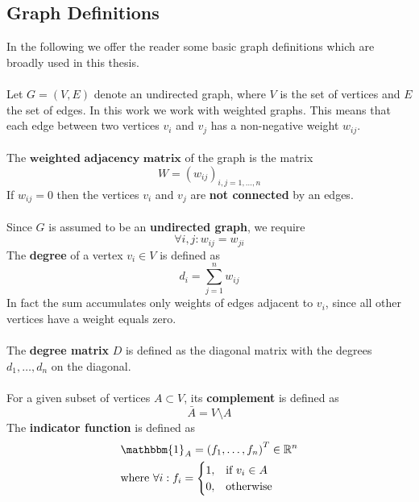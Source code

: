 \subsection{Graph Definitions}
In the following we offer the reader some basic graph definitions which are broadly used in this thesis. \\ \\ 
Let $G = (V, E)$ denote an undirected graph, where $V$ is the set of vertices and $E$ the set of edges. In this work we work with weighted graphs. This means that each edge between two vertices $v_i$ and $v_j$ has a non-negative weight $w_{ij}$. \\ \\
The $\textbf{weighted adjacency matrix}$ of the graph is the matrix 
\begin{equation}
W = \left( w_{ij} \right)_{i,j=1,\dots, n}
\label{eq:def_adjacency_matrix}
\end{equation}
If $w_{ij} = 0$ then the vertices $v_i$ and $v_j$ are \textbf{not connected} by an edges. \\ \\
Since $G$ is assumed to be an \textbf{undirected graph}, we require
\begin{equation}
	\forall i,j : w_{ij} = w_{ji}
\end{equation}
The \textbf{degree} of a vertex $v_i \in V$ is defined as
\begin{equation}
	d_i = \sum_{j=1}^n w_{ij}
\label{eq:vertex_degree}
\end{equation}
In fact the sum accumulates only weights of edges adjacent to $v_i$, since all other vertices have a weight equals zero. \\ \\
The \textbf{degree matrix} $D$ is defined as the diagonal matrix with the degrees $d_1,\dots, d_n$ on the diagonal. \\ \\
For a given subset of vertices $A \subset V$, its \textbf{complement} is defined as
\begin{equation}
	\bar{A} = V \setminus A
\label{eq:set_complement}
\end{equation}
The \textbf{indicator function} is defined as
\begin{equation}
\begin{aligned}
& \mathbbm{1}_A = \left( f_1, \dots, f_n \right)^{T} \in \mathbb{R}^n \\
& \text{where } \forall i: f_i= 
\begin{cases}
    1,& \text{if } v_i\in A\\
    0,              & \text{otherwise}
\end{cases}
\end{aligned}
\end{equation}
